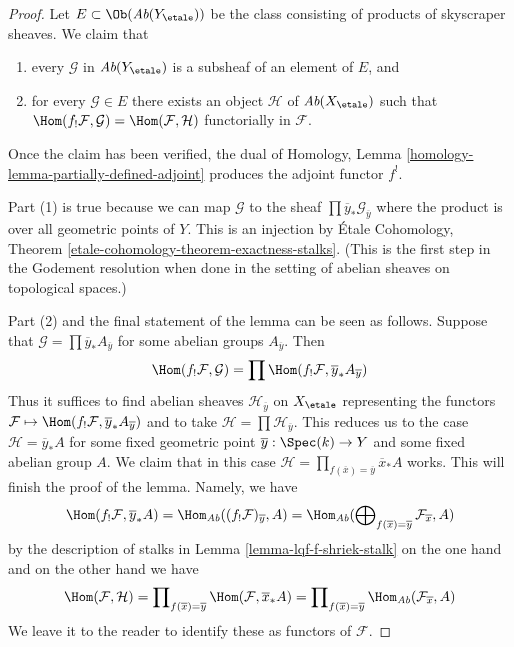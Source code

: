 \begin{proof}
Let $E \subset \Ob(\textit{Ab}(Y_\etale))$ be the class consisting of
products of skyscraper sheaves. We claim that
\begin{enumerate}
\item every $\mathcal{G}$ in $\textit{Ab}(Y_\etale)$ is a subsheaf
of an element of $E$, and
\item for every $\mathcal{G} \in E$ there exists an object
$\mathcal{H}$ of $\textit{Ab}(X_\etale)$ such that
$\Hom(f_!\mathcal{F}, \mathcal{G}) = \Hom(\mathcal{F}, \mathcal{H})$
functorially in $\mathcal{F}$.
\end{enumerate}
Once the claim has been verified, the dual of
Homology, Lemma \ref{homology-lemma-partially-defined-adjoint}
produces the adjoint functor $f^!$.

\medskip\noindent
Part (1) is true because we can map $\mathcal{G}$ to the sheaf
$\prod \overline{y}_*\mathcal{G}_{\overline{y}}$ where the
product is over all geometric points of $Y$. This is an injection by
\'Etale Cohomology, Theorem \ref{etale-cohomology-theorem-exactness-stalks}.
(This is the first step in the Godement resolution when
done in the setting of abelian sheaves on topological spaces.)

\medskip\noindent
Part (2) and the final statement of the lemma can be seen as follows.
Suppose that
$\mathcal{G} = \prod \overline{y}_*A_{\overline{y}}$
for some abelian groups $A_{\overline{y}}$. Then
$$
\Hom(f_!\mathcal{F}, \mathcal{G}) =
\prod \Hom(f_!\mathcal{F}, \overline{y}_*A_{\overline{y}})
$$
Thus it suffices to find abelian sheaves $\mathcal{H}_{\overline{y}}$
on $X_\etale$ representing the functors
$\mathcal{F} \mapsto \Hom(f_!\mathcal{F}, \overline{y}_*A_{\overline{y}})$
and to take $\mathcal{H} = \prod \mathcal{H}_{\overline{y}}$.
This reduces us to the case $\mathcal{H} = \overline{y}_*A$
for some fixed geometric point $\overline{y} : \Spec(k) \to Y$
and some fixed abelian group $A$. We claim that in this case
$\mathcal{H} = \prod_{f(\overline{x}) = \overline{y}} \overline{x}_*A$ works.
This will finish the proof of the lemma.
Namely, we have
$$
\Hom(f_!\mathcal{F}, \overline{y}_*A) =
\Hom_{\textit{Ab}}((f_!\mathcal{F})_{\overline{y}}, A) =
\Hom_{\textit{Ab}}(\bigoplus\nolimits_{f(\overline{x}) = \overline{y}}
\mathcal{F}_{\overline{x}}, A)
$$
by the description of stalks in
Lemma \ref{lemma-lqf-f-shriek-stalk}
on the one hand and on the other hand we have
$$
\Hom(\mathcal{F}, \mathcal{H}) =
\prod\nolimits_{f(\overline{x}) = \overline{y}}
\Hom(\mathcal{F}, \overline{x}_*A) =
\prod\nolimits_{f(\overline{x}) = \overline{y}}
\Hom_{\textit{Ab}}(\mathcal{F}_{\overline{x}}, A)
$$
We leave it to the reader to identify these as functors of $\mathcal{F}$.
\end{proof}

